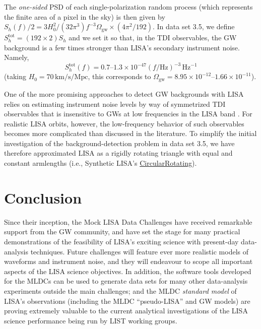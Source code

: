 \documentclass{iopart}
\begin{document}
The \emph{one-sided} PSD of each single-polarization random process (which represents the finite area of a pixel in the sky) is then given by $S_h(f)/2 = 3 H_0^2/(32 \pi^3) f^{-3} \Omega_\mathrm{gw} \times (4 \pi^2 / 192)$.
In data set 3.5, we define $S^\mathrm{tot}_h = (192 \times 2) S_h$ and we set it so that, in the TDI observables, the GW background is a few times stronger than LISA's secondary instrument noise. Namely, 
%
\begin{equation}
S^\mathrm{tot}_h(f) = 0.7\mbox{--}1.3 \times 10^{-47} (f/\mathrm{Hz})^{-3} \, \mathrm{Hz}^{-1}
\end{equation}
%
(taking $H_0 = 70 \, \mathrm{km} / \mathrm{s} / \mathrm{Mpc}$, this corresponds to $\Omega_\mathrm{gw}=8.95\times 10^{-12}\mbox{--}1.66\times 10^{-11}$).

One of the more promising approaches to detect GW backgrounds with LISA relies on estimating instrument noise levels by way of symmetrized TDI observables that is insensitive to GWs at low frequencies in the LISA band \cite{zetapaper,hoganbender,rrv}. For realistic LISA orbits, however, the low-frequency behavior of such observables becomes more complicated than discussed in the literature. To simplify the initial investigation of the background-detection problem in data set 3.5, we have therefore approximated 
LISA as a rigidly rotating triangle with equal and constant armlengths (i.e., Synthetic LISA's \url{CircularRotating}).

\section{Conclusion}

Since their inception, the Mock LISA Data Challenges have received remarkable support from the GW community, and have set the stage for many practical demonstrations of the feasibility of LISA's exciting science with present-day data-analysis techniques. Future challenges will feature ever more realistic models of waveforms and instrument noise, and they will endeavour to scope all important aspects of the LISA science objectives.
In addition, the software tools developed for the MLDCs \cite{lisatools} can be used to generate data sets for many other data-analysis experiments outside the main challenges; and the MLDC \emph{standard model} of LISA's observations (including the MLDC ``pseudo-LISA'' and GW models) are proving extremely valuable to the current analytical investigations of the LISA science performance being run by LIST working groups.
\end{document}
